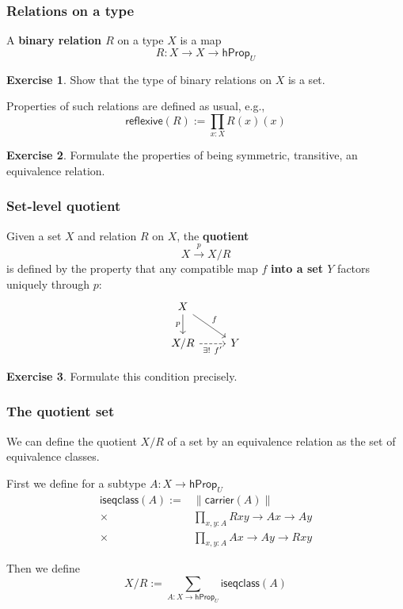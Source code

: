 \documentclass{beamer}
\newcommand{\fat}[1]{\textbf{#1}}
\newcommand{\constfont}[1]{\ensuremath{\mathsf{#1}}}
\newcommand{\hProp}{\constfont{hProp}}
\newcommand{\carrier}{\constfont{carrier}}
\theoremstyle{definition}
\newtheorem{exercise}{Exercise}
\begin{document}
\begin{frame}
 \frametitle{Relations on a type}

  A \fat{binary relation $R$} on a type $X$ is a map
  \[ R : X \to X \to \hProp_U \]\pause

  \begin{exercise}
   Show that the type of binary relations on $X$ is a set.
  \end{exercise}\pause

  Properties of such relations are defined as usual, e.g.,
  \[ \constfont{reflexive}(R) := \prod_{x : X} R(x)(x) \]\pause

  \begin{exercise}
   Formulate the properties of being symmetric, transitive, an equivalence relation.
  \end{exercise}

\end{frame}

\begin{frame}
  \frametitle{Set-level quotient}
  Given a set $X$ and relation $R$ on $X$, the \fat{quotient}
  \[ X \xrightarrow{p} X/R \]
  is defined by the property that any compatible map $f$ \fat{into a set $Y$} factors uniquely through $p$:
  \[
    \begin{tikzcd}[ampersand replacement=\&]
      X\ar[d, "p"']\ar[rd, "f"] \& \\
      X/R \ar[r, "\exists !~ f'"', dashed] \& Y
    \end{tikzcd}
  \]
  \begin{exercise}
    Formulate this condition precisely. %
  \end{exercise}
\end{frame}

\begin{frame}
  \frametitle{The quotient set}
  We can define the quotient $X/R$ of a set by an equivalence relation as the set of equivalence classes.\pause

  First we define for a subtype $A:X\to\hProp_U$
  \[
    \begin{split}
    \constfont{iseqclass}(A) :=
    &\left\lVert\carrier(A)\right\rVert\\
    \times&\prod_{x,y:A} R x y \to A x \to A y\\
    \times&\prod_{x,y:A} A x \to A y \to R x y
    \end{split}
  \]\pause

  Then we define
  \[
    X/R := \sum_{A:X\to\hProp_U}\constfont{iseqclass}(A)
  \]
\end{frame}
\end{document}
